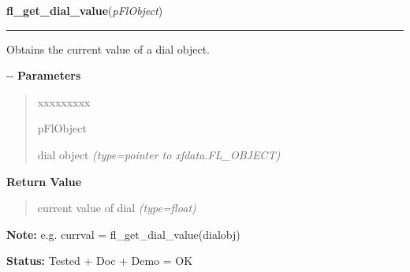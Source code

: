 \hspace{.8\funcindent}\begin{boxedminipage}{\funcwidth}

    \raggedright \textbf{fl\_get\_dial\_value}(\textit{pFlObject})

    \vspace{-1.5ex}

    \rule{\textwidth}{0.5\fboxrule}
\setlength{\parskip}{2ex}

Obtains the current value of a dial object.

-{}-
\setlength{\parskip}{1ex}
      \textbf{Parameters}
      \vspace{-1ex}

      \begin{quote}
        \begin{Ventry}{xxxxxxxxx}

          \item[pFlObject]


dial object
            {\it (type=pointer to xfdata.FL\_OBJECT)}

        \end{Ventry}

      \end{quote}

      \textbf{Return Value}
    \vspace{-1ex}

      \begin{quote}

current value of dial
      {\it (type=float)}

      \end{quote}

\textbf{Note:} 
e.g. currval = fl\_get\_dial\_value(dialobj)


\textbf{Status:} 
Tested + Doc + Demo = OK


    \end{boxedminipage}

    \label{xformslib:fldial:fl_set_dial_bounds}

    \vspace{0.5ex}

